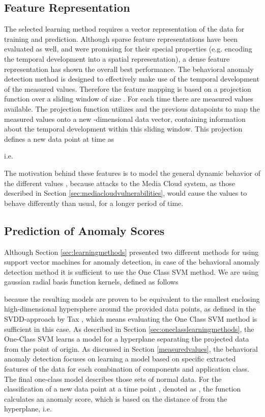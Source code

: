 \documentclass{llncs}
\begin{document}
\subsection{Feature Representation}
\label{featurerepresentation}

The selected learning method requires a vector representation of the data for training and prediction. Although sparse feature representations have been evaluated as well, and were promising for their special properties (e.g. encoding the temporal development into a spatial representation), a dense feature representation has shown the overall best performance. The behavioral anomaly detection method is designed to effectively make use of the temporal development of the measured values. Therefore the feature mapping is based on a projection function  over a sliding window of size . For each time  there are measured values  available. The projection function utilizes  and the  previous datapoints  to map the measured values onto a new -dimensional data vector, containing information about the temporal development within this sliding window. This projection defines a new data point  at time  as 

i.e.


The motivation behind these features is to model the general dynamic behavior of the different values , because attacks to the Media Cloud system, as those described in Section \ref{sec:mediacloudvulnerabilities}, would cause the values to behave differently than usual, for a longer period of time.

\subsection{Prediction of Anomaly Scores}
\label{sec:behav_model_and_prediction}
Although Section \ref{sec:learningmethods} presented two different methods for using support vector machines for anomaly detection, in case of the behavioral anomaly detection method it is sufficient to use the One Class SVM method. We are using gaussian radial basis function kernels, defined as follows



because the resulting models are proven to be equivalent to the smallest enclosing high-dimensional hypersphere around the provided data points, as defined in the SVDD-approach by Tax \cite{tax2004support}, which means evaluating the One Class SVM method is sufficient in this case. As described in Section \ref{sec:oneclasslearningmethods}, the One-Class SVM learns a model for a hyperplane separating the projected data from the point of origin. 
As discussed in Section \ref{measuredvalues}, the behavioral anomaly detection
focuses on learning a model based on specific extracted features of the data for each combination of components and application class. The final one-class model describes those sets of normal data. For the classification of a new data point  at a time point , denoted as ,  the function  calculates an anomaly score, which is based on the distance of  from the hyperplane, i.e. 
\end{document}
